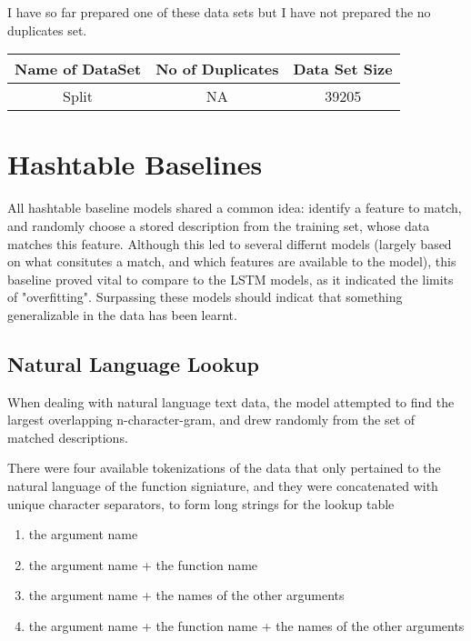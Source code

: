I have so far prepared one of these data sets but I have not prepared the no duplicates set.

\begin{center}
\begin{tabular}{|| c | c | c ||}
  \hline
   Name of DataSet & No of Duplicates & Data Set Size \\
  \hline
   Split    & NA & 39205\\ 
  \hline
\end{tabular}
\end{center}

\section{Hashtable Baselines} %
\label{sub:hashtable_baseline}

All hashtable baseline models shared a common idea: identify a feature to match, and randomly choose a stored description from the training set, whose data matches this feature. 
Although this led to several differnt models (largely based on what consitutes a match, and which features are available to the model), this baseline proved vital to compare to the LSTM models, as it indicated the limits of "overfitting". 
Surpassing these models should indicat that something generalizable in the data has been learnt.

\subsection{Natural Language Lookup} %
\label{sub:natural_language_lookup}
When dealing with natural language text data, the model attempted to find the largest overlapping n-character-gram, and drew randomly from the set of matched descriptions.

There were four available tokenizations of the data that only pertained to the natural language of the function signiature, and they were concatenated with unique character separators, to form long strings for the lookup table


\begin{enumerate}
    \item the argument name
    \item the argument name + the function name
    \item the argument name + the names of the other arguments
    \item the argument name + the function name + the names of the other arguments
\end{enumerate}

